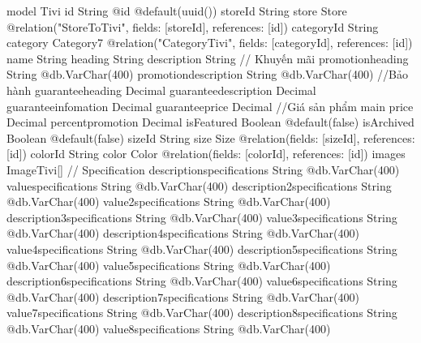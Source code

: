 model Tivi {
  id                          String                     @id @default(uuid())
  storeId                     String
  store                       Store                      @relation("StoreToTivi", fields: [storeId], references: [id])
  categoryId              String
  category                Category7                  @relation("CategoryTivi", fields: [categoryId], references: [id])
  name                        String
  heading                     String
  description                 String
  // Khuyến mãi
  promotionheading            String                     @db.VarChar(400)
  promotiondescription        String                     @db.VarChar(400)
  //Bảo hành
  guaranteeheading            Decimal
  guaranteedescription        Decimal
  guaranteeinfomation         Decimal
  guaranteeprice              Decimal
  //Giá sản phẩm main
  price                       Decimal
  percentpromotion            Decimal
  isFeatured                  Boolean                    @default(false)
  isArchived                  Boolean                    @default(false)
  sizeId                      String
  size                        Size                       @relation(fields: [sizeId], references: [id])
  colorId                     String
  color                       Color                      @relation(fields: [colorId], references: [id])
  images                  ImageTivi[]
  // Specification
  descriptionspecifications   String                     @db.VarChar(400)
  valuespecifications         String                     @db.VarChar(400)
  description2specifications  String                     @db.VarChar(400)
  value2specifications        String                     @db.VarChar(400)
  description3specifications  String                     @db.VarChar(400)
  value3specifications        String                     @db.VarChar(400)
  description4specifications  String                     @db.VarChar(400)
  value4specifications        String                     @db.VarChar(400)
  description5specifications  String                     @db.VarChar(400)
  value5specifications        String                     @db.VarChar(400)
  description6specifications  String                     @db.VarChar(400)
  value6specifications        String                     @db.VarChar(400)
  description7specifications  String                     @db.VarChar(400)
  value7specifications        String                     @db.VarChar(400)
  description8specifications  String                     @db.VarChar(400)
  value8specifications        String                     @db.VarChar(400)
}
